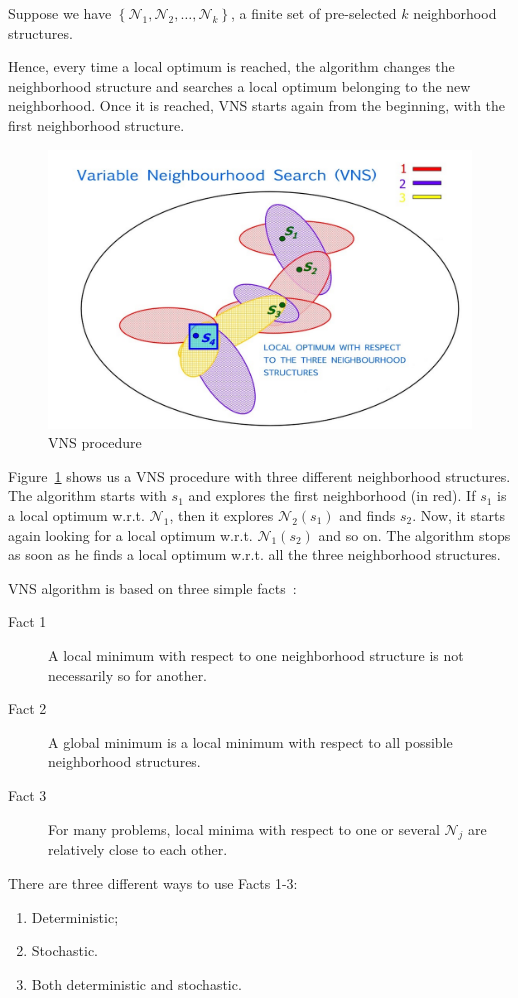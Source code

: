 Suppose we have $\left\{\mathcal N_1,\mathcal N_2, \dots, \mathcal N_k \right\}$, a finite set of pre-selected $k$ neighborhood structures.

Hence, every time a local optimum is reached, the algorithm changes the neighborhood structure and searches a local optimum belonging to the new neighborhood. Once it is reached, VNS  starts again from the beginning, with the first neighborhood structure. 


\begin{figure}
	\centering
	\includegraphics[width=.65\textwidth]{VNS.jpg}
	\caption{VNS procedure}
	\label{fig:VNS}
\end{figure}


Figure~\ref{fig:VNS} shows us a VNS procedure with three different neighborhood structures. The algorithm starts with $s_1$ and explores the first neighborhood (in red). If $s_1$ is a local optimum w.r.t. $\mathcal N_1$, then it explores $\mathcal{N}_2(s_1)$ and finds $s_2$. Now, it starts again looking for a local optimum w.r.t. $\mathcal{N}_1(s_2)$ and so on. The algorithm stops as soon as he finds a local optimum w.r.t. all the three neighborhood structures.



VNS algorithm is based on three simple facts~\cite{Gendreau2019}:
\begin{description}
	\item[Fact 1] A local minimum with respect to one neighborhood structure is not necessarily so for another.
	\item[Fact 2] A global minimum is a local minimum with respect to all possible neighborhood structures.
	\item[Fact 3] For many problems, local minima with respect to one or several $\mathcal N_j$ are relatively close to each other. 
\end{description}

There are three different ways to use Facts 1-3:
\begin{enumerate}
	\item Deterministic;
	\item Stochastic. 
	\item Both deterministic and stochastic. 
\end{enumerate} 

